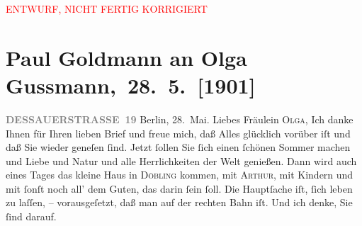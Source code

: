 
\begin{center}
            \textcolor{red}{ENTWURF, NICHT FERTIG KORRIGIERT}
                      \end{center}
            
         
         \renewcommand{\erwaehntePersonen}{Personen: Olga Schnitzler, Elisabeth Steinrück}
         \renewcommand{\erwaehnteOrte}{Orte: Berlin, Brühl, Dessauer Straße, Wien, Wörthersee, XIX., Döbling}
         \renewcommand{\erwaehnteWerke}{}
               \section[ Paul Goldmann an Olga Gussmann, 28. 5. {[}1901{]}]{ Paul Goldmann an Olga Gussmann, 28. 5. {[}1901{]}}\nopagebreak{}\rehead{ }\begin{ledgroupsized}[t]{13cm}\normalsize\beginnumbering \toendnotes[C]{\smallbreak\pagebreak[2]} 
\toendnotes[C]{\smallbreak}\pstart
           \noindent{}\raggedleft{}{\pb}\textcolor{gray}{\textbf{DESSAUERSTRASSE 19}}\pend
           \pstart
           Berlin, 28. Mai.\pend
           \pstart\center{}Liebes Fräulein \textsc{Olga},\pend\pstart
           Ich danke Ihnen für Ihren lieben Brief und freue mich, daß Alles glücklich vorüber
               iſt und daß Sie wieder geneſen ſind. Jetzt ſollen Sie ſich einen ſchönen Sommer
               machen und Liebe und Natur und alle Herrlichkeiten der Welt genießen. Dann wird auch
               eines Tages das kleine Haus in \textsc{Döbling} kommen, mit \textsc{Arthur}, mit Kindern und mit {\pb}ſonſt noch all’ dem
               Guten, das darin ſein ſoll. Die Hauptſache iſt, ſich leben zu laſſen, –
               vorausgeſetzt, daß man auf der rechten Bahn iſt. Und ich denke, Sie ſind darauf.\pend

\end{ledgroupsized}

